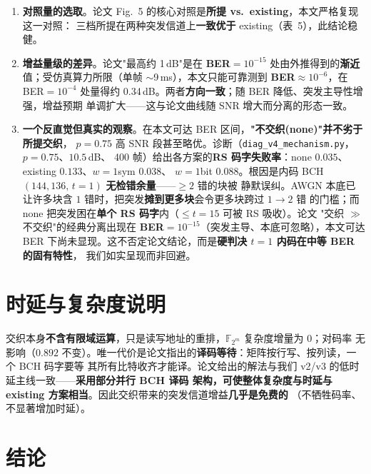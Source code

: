\documentclass[11pt,a4paper]{article}
\begin{document}
\begin{warnbox}[title=\textbf{三点如实交代}]
\begin{enumerate}[leftmargin=1.6em, itemsep=2pt]
\item \textbf{对照量的选取}。论文 Fig.~5 的核心对照是\textbf{所提 vs.\ existing}，本文严格复现这一对照：
      三档所提在两种突发信道上\textbf{一致优于} existing（表~5），此结论稳健。
\item \textbf{增益量级的差异}。论文"最高约 1\,dB"是在 \textbf{BER$=10^{-15}$} 处由外推得到的\textbf{渐近}
      值；受仿真算力所限（单帧 $\sim$9\,ms），本文只能可靠测到 \textbf{BER$\approx10^{-6}$}，在
      BER$=10^{-4}$ 处量得约 0.34\,dB。两者\textbf{方向一致}；随 BER 降低、突发主导性增强，增益预期
      单调扩大——这与论文曲线随 SNR 增大而分离的形态一致。
\item \textbf{一个反直觉但真实的观察}。在本文可达 BER 区间，\textbf{"不交织(none)"并不劣于所提交织}，
      $p{=}0.75$ 高 SNR 段甚至略优。诊断（\texttt{diag\_v4\_mechanism.py}，$p{=}0.75$、$10.5$\,dB、
      400 帧）给出各方案的\textbf{RS 码字失败率}：none $0.035$、existing $0.133$、$w{=}1$sym $0.038$、
      $w{=}1$bit $0.088$。根因是内码 BCH$(144,136,\,t{=}1)$ \textbf{无检错余量}——$\ge 2$ 错的块被
      静默误纠。AWGN 本底已让许多块含 $1$ 错时，把突发\textbf{摊到更多块}会令更多块跨过 $1\to2$ 错
      的门槛；而 none 把突发困在\textbf{单个 RS 码字}内（$\le t{=}15$ 可被 RS 吸收）。论文
      "交织 $\gg$ 不交织"的经典分离出现在 \textbf{BER$=10^{-15}$}（突发主导、本底可忽略），本文可达
      BER 下尚未显现。这不否定论文结论，而是\textbf{硬判决 $t{=}1$ 内码在中等 BER 的固有特性}，
      我们如实呈现而非回避。
\end{enumerate}
\end{warnbox}

\section{时延与复杂度说明}

交织本身\textbf{不含有限域运算}，只是读写地址的重排，$\mathbb{F}_{2^m}$ 复杂度增量为 0；对码率
无影响（$0.892$ 不变）。唯一代价是论文指出的\textbf{译码等待}：矩阵按行写、按列读，一个 BCH 码字要等
其所有比特收齐才能译。论文给出的解法与我们 v2/v3 的低时延主线一致——\textbf{采用部分并行 BCH 译码
架构，可使整体复杂度与时延与 existing 方案相当}。因此交织带来的突发信道增益\textbf{几乎是免费的}
（不牺牲码率、不显著增加时延）。

\section{结论}
\end{document}
